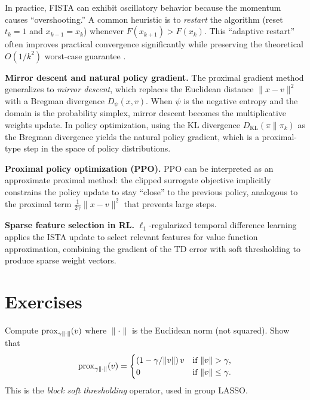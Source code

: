 \documentclass[11pt,a4paper]{article}
\begin{document}
\begin{remark}\label{rem:restart}
In practice, FISTA can exhibit oscillatory behavior because the
momentum causes ``overshooting.'' A common heuristic is to
\emph{restart} the algorithm (reset $t_k = 1$ and $x_{k-1} = x_k$)
whenever $F(x_{k+1}) > F(x_k)$. This ``adaptive restart'' often
improves practical convergence significantly while preserving the
theoretical $O(1/k^2)$ worst-case guarantee \citep{beck2009}.
\end{remark}

\begin{rlconnection}[title={Proximal Methods in RL}]
\textbf{Mirror descent and natural policy gradient.} The proximal
gradient method generalizes to \emph{mirror descent}, which replaces
the Euclidean distance $\|x - v\|^2$ with a Bregman divergence
$D_\psi(x, v)$. When $\psi$ is the negative entropy and the domain
is the probability simplex, mirror descent becomes the multiplicative
weights update. In policy optimization, using the KL divergence
$D_{\mathrm{KL}}(\pi \| \pi_k)$ as the Bregman divergence yields
the natural policy gradient, which is a proximal-type step in the
space of policy distributions.

\textbf{Proximal policy optimization (PPO).} PPO can be interpreted
as an approximate proximal method: the clipped surrogate objective
implicitly constrains the policy update to stay ``close'' to the
previous policy, analogous to the proximal term
$\frac{1}{2\gamma}\|x - v\|^2$ that prevents large steps.

\textbf{Sparse feature selection in RL.}
$\ell_1$-regularized temporal difference learning applies the ISTA
update to select relevant features for value function approximation,
combining the gradient of the TD error with soft thresholding to
produce sparse weight vectors.
\end{rlconnection}


\section{Exercises}\label{sec:exercises}

\begin{exercise}\label{ex:l2-norm}
Compute $\operatorname{prox}_{\gamma\|\cdot\|}(v)$ where $\|\cdot\|$ is the
Euclidean norm (not squared). Show that
\[
  \operatorname{prox}_{\gamma\|\cdot\|}(v) = \begin{cases}
    (1 - \gamma/\|v\|)\,v & \text{if } \|v\| > \gamma, \\
    0 & \text{if } \|v\| \le \gamma.
  \end{cases}
\]
This is the \emph{block soft thresholding} operator, used in group
LASSO.
\end{exercise}
\end{document}
